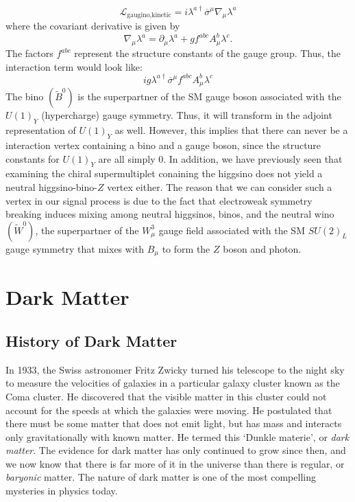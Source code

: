\[\mathcal{L}_{\text{gaugino,kinetic}} = i\lambda^{a\dagger}\overline{\sigma}^\mu\nabla_\mu\lambda^a\]
where the covariant derivative is given by
\[\nabla_\mu\lambda^a = \partial_\mu\lambda^a + gf^{abc}A_\mu^b\lambda^c.\]
The factors $f^{abc}$ represent the structure constants of the gauge group. Thus, the interaction term would look like:
\[ig\lambda^{a\dagger}\overline{\sigma}^\mu f^{abc}A_\mu^b\lambda^c\]
The bino $(\widetilde{B}^0)$ is the superpartner of the SM gauge boson associated with the $U(1)_Y$ (hypercharge) gauge symmetry. Thus, it will transform in the adjoint representation of $U(1)_Y$ as well. However, this implies that there can never be a interaction vertex containing a bino and a gauge boson, since the structure constants for $U(1)_Y$ are all simply 0. In addition, we have previously seen that examining the chiral supermultiplet conaining the higgsino does not yield a neutral higgsino-bino-$Z$ vertex either. The reason that we can consider such a vertex in our signal process is due to the fact that electroweak symmetry breaking induces mixing among neutral higgsinos, binos, and the neutral wino $(\widetilde{W}^0)$, the superpartner of the $W_\mu^3$ gauge field associated with the SM $SU(2)_L$ gauge symmetry that mixes with $B_\mu$ to form the $Z$ boson and photon.

\section{Dark Matter}\label{sec:dark_matter}
\subsection{History of Dark Matter}\label{subsec:history-of-dark-matter}

In 1933, the Swiss astronomer Fritz Zwicky turned his telescope to the night sky to measure the velocities of galaxies in a particular galaxy cluster known as the Coma cluster. He discovered that the visible matter in this cluster could not account for the speeds at which the galaxies were moving. He postulated that there must be some matter that does not emit light, but has mass and interacts only gravitationally with known matter. He termed this `Dunkle materie', or \emph{dark matter}. The evidence for dark matter has only continued to grow since then, and we now know that there is far more of it in the universe than there is regular, or \emph{baryonic} matter. The nature of dark matter is one of the most compelling mysteries in physics today.

